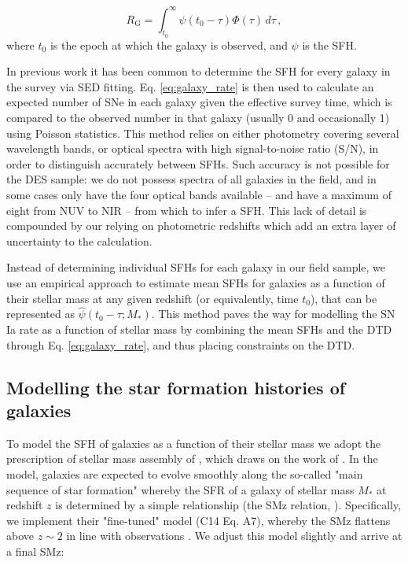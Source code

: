 \documentclass[fleqn,usenatbib]{mnras}
\begin{document}
\begin{equation}
    R_{\mathrm{G}} = \int_{t_0}^{\infty} \psi(t_0-\tau)\Phi(\tau)\,d\tau \,,
    \label{eq:galaxy_rate}
\end{equation}
where $t_0$ is the epoch at which the galaxy is observed, and $\psi$ is the SFH. 

In previous work \citep[e.g.][]{Strolger2004,Maoz2012} it has been common to determine the SFH for every galaxy in the survey via SED fitting. Eq. \ref{eq:galaxy_rate} is then used to calculate an expected number of SNe in each galaxy given the effective survey time, which is compared to the observed number in that galaxy (usually 0 and occasionally 1) using Poisson statistics. This method relies on either photometry covering several wavelength bands, or optical spectra with high signal-to-noise ratio (S/N), in order to distinguish accurately between SFHs. Such accuracy is not possible for the DES sample: we do not possess spectra of all galaxies in the field, and in some cases only have the four optical bands available -- and have a maximum of eight from NUV to NIR -- from which to infer a SFH. This lack of detail is compounded by our relying on photometric redshifts which add an extra layer of uncertainty to the calculation. 

Instead of determining individual SFHs for each galaxy in our field sample, we use an empirical approach to estimate mean SFHs for galaxies as a function of their stellar mass at any given redshift (or equivalently, time $t_0$), that can be represented as $\hat \psi \left(t_0 -\tau; M_* \right)$. This method paves the way for modelling the SN Ia rate as a function of stellar mass by combining the mean SFHs and the DTD through Eq. \ref{eq:galaxy_rate}, and thus placing constraints on the DTD.

\subsection{Modelling the star formation histories of galaxies \label{subsec:method_sfh}}

To model the SFH of galaxies as a function of their stellar mass we adopt the prescription of stellar mass assembly of \citet{Childress2014}, which draws on the work of \citet{Zahid2012}. In the model, galaxies are expected to evolve smoothly along the so-called "main sequence of star formation" whereby the SFR of a galaxy of stellar mass $M_*$ at redshift $z$ is determined by a simple relationship (the SMz relation, \citealt{Zahid2012}). Specifically, we implement their "fine-tuned" model (C14 Eq. A7), whereby the SMz flattens above $z\sim2$ in line with observations \citep{Stark2013}. We adjust this model slightly and arrive at a final SMz:
\end{document}
